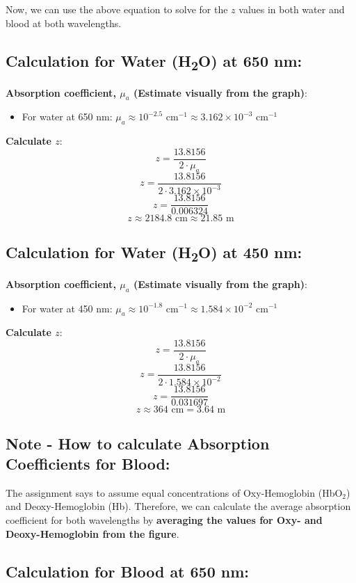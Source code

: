 \documentclass[12pt]{article}
\begin{document}
Now, we can use the above equation to solve for the $z$ values in both water and blood at both wavelengths.

\subsection*{Calculation for Water (H\textsubscript{2}O) at 650 nm:}
\textbf{Absorption coefficient, \( \mu_a\) (Estimate visually from the graph)}:
\begin{itemize}
    \item For water at 650 nm: \( \mu_a \approx 10^{-2.5} \text{ cm}^{-1} \approx 3.162 \times 10^{-3} \text{ cm}^{-1} \)
\end{itemize}

\textbf{Calculate \( z \)}:
\[ z = \frac{13.8156}{2 \cdot \mu_a} \]
\[ z = \frac{13.8156}{2 \cdot 3.162 \times 10^{-3}} \]
\[ z = \frac{13.8156}{0.006324} \]
\[ z \approx 2184.8 \text{ cm} \approx 21.85 \text{ m} \]

\subsection*{Calculation for Water (H\textsubscript{2}O) at 450 nm:}
\textbf{Absorption coefficient, \( \mu_a\) (Estimate visually from the graph)}:
\begin{itemize}
    \item For water at 450 nm: \( \mu_a \approx 10^{-1.8} \text{ cm}^{-1} \approx 1.584 \times 10^{-2} \text{ cm}^{-1} \)
\end{itemize}

\textbf{Calculate \( z \)}:
\[ z = \frac{13.8156}{2 \cdot \mu_a} \]
\[ z = \frac{13.8156}{2 \cdot 1.584 \times 10^{-2}} \]
\[ z = \frac{13.8156}{0.031697} \]
\[ z \approx 364 \text{ cm} = 3.64 \text{ m} \]

\subsection*{Note - How to calculate Absorption Coefficients for Blood:}
The assignment says to assume equal concentrations of Oxy-Hemoglobin (HbO\(_2\)) and Deoxy-Hemoglobin (Hb). Therefore, we can calculate the average absorption coefficient for both wavelengths by \textbf{averaging the values for Oxy- and Deoxy-Hemoglobin from the figure}.

\subsection*{Calculation for Blood at 650 nm:}
\end{document}
